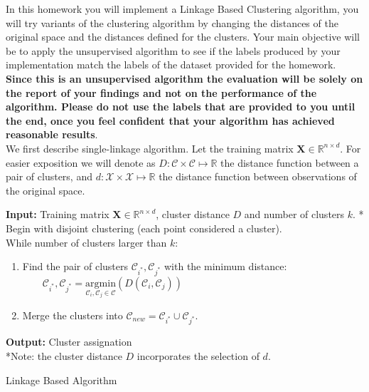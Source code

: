 \documentclass{article}
\begin{document}
In this homework you will implement a Linkage Based Clustering algorithm, you will try variants of the clustering algorithm by changing the distances of the original space and the distances defined for the clusters. Your main objective will be to apply the unsupervised algorithm to see if the  labels produced by your implementation match the  labels of the dataset provided for the homework.\\

\textbf{Since this is an unsupervised algorithm the evaluation will be solely on the report of your findings and not on the performance of the algorithm. Please do not use the  labels that are provided to you until the end, once you feel confident that your algorithm has achieved reasonable results}. \\

We first describe single-linkage algorithm. Let the training matrix $\mathbf{X}\in\mathbb{R}^{n\times d}$. For easier exposition we will denote as $D: \mathcal{C}\times\mathcal{C}\mapsto \mathbb{R}$ the distance function between a pair of clusters, and $d:\mathcal{X}\times \mathcal{X}\mapsto \mathbb{R}$ the distance function between observations of the original space.

\vspace{5mm}

\begin{algorithm}[H]
\SetAlgoLined
\textbf{Input:} Training matrix $\mathbf{X}\in\mathbb{R}^{n\times d}$, cluster distance $D$ and number of clusters $k$. * \\
Begin with disjoint clustering (each point considered a cluster). \\
\vspace{2mm}
While number of clusters larger than $k$:
\begin{enumerate}
\item Find the pair of clusters $\mathcal{C}_{i^*}, \mathcal{C}_{j^*}$ with the minimum distance:\\
        $\qquad \mathcal{C}_{i^*}, \mathcal{C}_{j^*} =\underset{\mathcal{C}_{i}, \mathcal{C}_{j} \in \mathcal{C}}{\text{argmin}}
        \left(D(\mathcal{C}_{i},\mathcal{C}_{j})\right)$
\item Merge the clusters into $\mathcal{C}_{new}=\mathcal{C}_{i^*}\cup \mathcal{C}_{j^*}$.
\end{enumerate}
\textbf{Output:} Cluster assignation \\
*Note: the cluster distance $D$ incorporates the selection of $d$.
\caption{Linkage Based Algorithm}
\end{algorithm}
\end{document}
